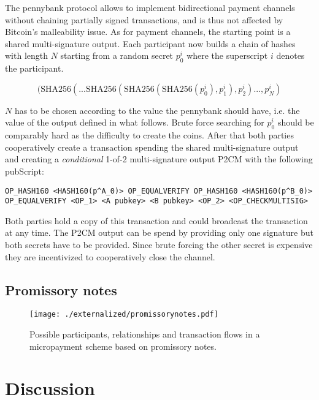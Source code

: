The pennybank protocol allows to implement bidirectional payment channels without chaining partially signed transactions, and is thus not affected by Bitcoin's malleability issue. As for payment channels, the starting point is a shared multi-signature output. Each participant now builds a chain of hashes with length $N$ starting from a random secret $p^i_0$ where the superscript $i$ denotes the participant. 

\begin{equation*}
(\text{SHA256}(... \text{SHA256}(\text{SHA256}(\text{SHA256}(p^i_0),p^i_1),p^i_2)...,p^i_N)
\end{equation*}

$N$ has to be chosen according to the value the pennybank should have, i.e. the value of the output defined in what follows. Brute force searching for $p^i_0$ should be comparably hard as the difficulty to create the coins.  After that both parties cooperatively create a transaction spending the shared multi-signature output and creating a \emph{conditional} 1-of-2 multi-signature output P2CM with the following pubScript:

\begin{lstlisting}
OP_HASH160 <HASH160(p^A_0)> OP_EQUALVERIFY OP_HASH160 <HASH160(p^B_0)> OP_EQUALVERIFY <OP_1> <A pubkey> <B pubkey> <OP_2> <OP_CHECKMULTISIG>
\end{lstlisting}

Both parties hold a copy of this transaction and could broadcast the transaction at any time. The P2CM output can be spend by providing only one signature but both secrets have to be provided. Since brute forcing the other secret is expensive they are incentivized to cooperatively close the channel.


\subsection{Promissory notes}

\cite{strawpay}
\cite{filament}

\begin{figure}
\centering
\texttt{[image: ./externalized/promissorynotes.pdf]}
\caption{Possible participants, relationships and transaction flows in a micropayment scheme based on promissory notes.}
\label{fig:promissorynotes}
\end{figure}


\section{Discussion}

